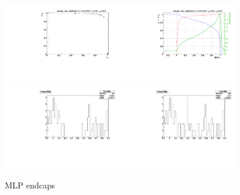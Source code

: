 \begin{figure}
  \centering
  \includegraphics[width=0.45\textwidth]{Figures/mlp/MLP_endcaps_roc}
  \includegraphics[width=0.45\textwidth]{Figures/mlp/MLP_endcaps_eff} \\
  \includegraphics[width=0.45\textwidth]{Figures/mlp/MLP_endcaps_mass}
  \includegraphics[width=0.45\textwidth]{Figures/mlp/MLP_endcaps_mass_unblind}
\caption{MLP endcaps}
\end{figure}
